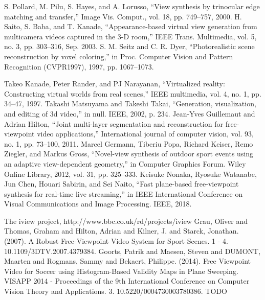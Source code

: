 \begin{thebibliography}{00}
     S. Pollard, M. Pilu, S. Hayes, and A. Lorusso, “View synthesis by
    trinocular edge matching and transfer,” Image Vis. Comput., vol. 18,
    pp. 749–757, 2000.
     H. Saito, S. Baba, and T. Kanade, “Appearance-based virtual view
    generation from multicamera videos captured in the 3-D room,” IEEE
    Trans. Multimedia, vol. 5, no. 3, pp. 303–316, Sep. 2003.
     S. M. Seitz and C. R. Dyer, “Photorealistic scene reconstruction by
    voxel coloring,” in Proc. Computer Vision and Pattern Recognition
    (CVPR1997), 1997, pp. 1067–1073.
    
     Takeo Kanade, Peter Rander, and PJ Narayanan, “Virtualized reality:
    Constructing virtual worlds from real scenes,” IEEE multimedia, vol.
    4, no. 1, pp. 34–47, 1997.
     Takashi Matsuyama and Takeshi Takai, “Generation, visualization,
    and editing of 3d video,” in null. IEEE, 2002, p. 234.
     Jean-Yves Guillemaut and Adrian Hilton, “Joint multi-layer segmentation 
    and reconstruction for free-viewpoint video applications,”
    International journal of computer vision, vol. 93, no. 1, pp. 73–100,
    2011.
     Marcel Germann, Tiberiu Popa, Richard Keiser, Remo Ziegler, and
    Markus Gross, “Novel-view synthesis of outdoor sport events using
    an adaptive view-dependent geometry,” in Computer Graphics Forum.
    Wiley Online Library, 2012, vol. 31, pp. 325–333.
     Keisuke Nonaka, Ryosuke Watanabe, Jun Chen, Houari Sabirin, and
    Sei Naito, “Fast plane-based free-viewpoint synthesis for real-time
    live streaming,” in IEEE International Conference on Visual Communications 
    and Image Processing. IEEE, 2018.


     The iview project, http://www.bbc.co.uk/rd/projects/iview
     Grau, Oliver and Thomas, Graham and Hilton, Adrian and Kilner, J. and Starck, Jonathan. (2007). 
    A Robust Free-Viewpoint Video System for Sport Scenes. 1 - 4. 10.1109/3DTV.2007.4379384.
     Goorts, Patrik and Maesen, Steven and DUMONT, Maarten and Rogmans, Sammy and Bekaert, 
    Philippe. (2014). Free Viewpoint Video for Soccer using Histogram-Based Validity Maps in Plane Sweeping. 
    VISAPP 2014 - Proceedings of the 9th International Conference on Computer Vision Theory and Applications. 
    3. 10.5220/0004730003780386.
     TODO

\end{thebibliography}

